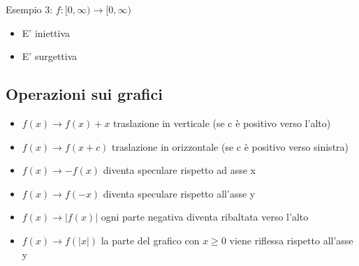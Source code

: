 %
\begin{minipage}[t]{0.48\textwidth}
	Esempio 3: $f : [0, \infty) \rightarrow [0,\infty)$
	\begin{center}
	\end{center}
	\begin{itemize}
		\item E' iniettiva
		\item E' surgettiva
	\end{itemize}

\end{minipage}
\subsection{Operazioni sui grafici}
\begin{itemize}
	\item $ f\left( x \right) \to f\left( x \right) +x$ \quad traslazione in verticale (se c è positivo verso l'alto)
	\item $ f\left( x \right) \rightarrow f\left( x+c \right) $ \quad traslazione in orizzontale (se c è positivo verso sinistra)
	\item $f\left( x \right)  \rightarrow -f\left( x \right) $ \quad diventa speculare rispetto ad asse x
	\item $f\left( x \right) \rightarrow f\left( -x \right) $ diventa speculare rispetto all'asse y
	\item $f\left( x \right) \rightarrow \left|f\left( x \right) \right|$ \quad ogni parte negativa diventa ribaltata verso l'alto
	\item $f\left( x \right) \rightarrow f\left( \left|x\right| \right) $ \quad la parte del grafico con $x\ge 0 $ viene riflessa rispetto all'asse y
\end{itemize}
\begin{minipage}[t]{0.48\textwidth}
\end{minipage}
%
\begin{minipage}[t]{0.48\textwidth}

\end{minipage}

